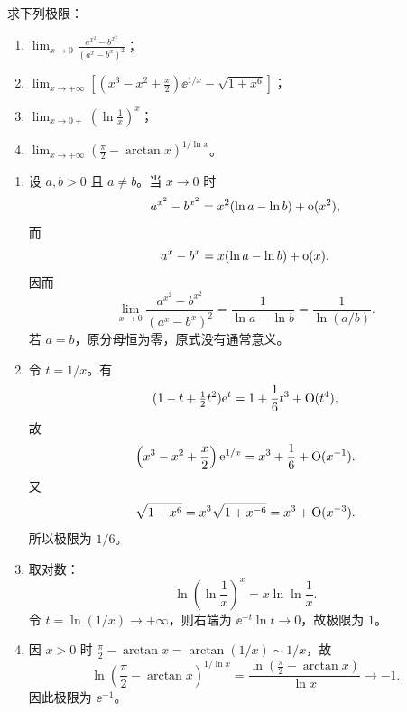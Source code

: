 \begin{xexercise}[2]
求下列极限：
  \begin{enumerate}[label=(\arabic*)]
    \item $\displaystyle\lim_{x\to0}\frac{a^{x^2}-b^{x^2}}{(a^x-b^x)^2}$；
    \item $\displaystyle\lim_{x\to+\infty}\left[\left(x^3-x^2+\frac x2\right)\ee^{1/x}-\sqrt{1+x^6}\right]$；
    \item $\displaystyle\lim_{x\to0+}\left(\ln\frac1x\right)^x$；
    \item $\displaystyle\lim_{x\to+\infty}\left(\frac\pi2-\arctan x\right)^{1/\ln x}$。
  \end{enumerate}
\end{xexercise}
\begin{xsolution}
\begin{enumerate}[label=(\arabic*)]
  \item 设 $a,b>0$ 且 $a\ne b$。当 $x\to0$ 时
  \[
    a^{x^2}-b^{x^2}=x^2(\ln a-\ln b)+\mathrm{o}(x^2),
  \]
  而
  \[
    a^x-b^x=x(\ln a-\ln b)+\mathrm{o}(x).
  \]
  因而
  \[
    \lim_{x\to0}\frac{a^{x^2}-b^{x^2}}{(a^x-b^x)^2}
    =\frac1{\ln a-\ln b}=\frac1{\ln(a/b)}.
  \]
  若 $a=b$，原分母恒为零，原式没有通常意义。

  \item 令 $t=1/x$。有
  \[
    (1-t+\tfrac12t^2)\mathrm{e}^t=1+\frac16t^3+\mathrm{O}(t^4),
  \]
  故
  \[
    \left(x^3-x^2+\frac x2\right)\mathrm{e}^{1/x}
    =x^3+\frac16+\mathrm{O}(x^{-1}).
  \]
  又
  \[
    \sqrt{1+x^6}=x^3\sqrt{1+x^{-6}}=x^3+\mathrm{O}(x^{-3}).
  \]
  所以极限为 $1/6$。

  \item 取对数：
  \[
    \ln\left(\ln\frac1x\right)^x=x\ln\ln\frac1x.
  \]
  令 $t=\ln(1/x)\to+\infty$，则右端为 $\ee^{-t}\ln t\to0$，故极限为 $1$。

  \item 因 $x>0$ 时 $\frac\pi2-\arctan x=\arctan(1/x)\sim1/x$，故
  \[
    \ln\left(\frac\pi2-\arctan x\right)^{1/\ln x}
    =\frac{\ln(\frac\pi2-\arctan x)}{\ln x}\to-1.
  \]
  因此极限为 $\ee^{-1}$。
\end{enumerate}
\end{xsolution}


